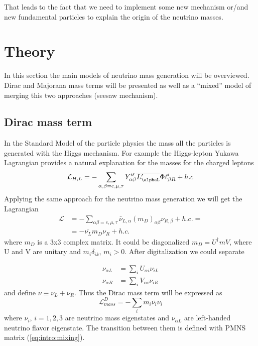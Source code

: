 \documentclass[../main.tex]{subfiles}
\begin{document}
That leads to the fact that we need to implement some new mechanism or/and new fundamental particles to explain the origin of the neutrino masses.

\section{Theory}
In this section the main models of neutrino mass generation will be overviewed. Dirac and Majorana mass terms will be presented as well as a ``mixed'' model of merging this two approaches (seesaw mechanism).

\subsection{Dirac mass term}
In the Standard Model of the particle physics the mass all the particles is generated with the Higgs mechanism. For example the Higgs-lepton Yukawa Lagrangian provides a natural explanation for the masses for the charged leptons
\begin{equation}
\mathcal{L}_{H, L}=-\sum_{\alpha, \beta=e,\mu,\tau}Y'^\ell_{\alpha\beta}\overline{L'_{\alphaL}}\Phi\ell'_{\beta R}+h.c
\end{equation}
Applying the same approach for the neutrino mass generation we will get the Lagrangian
\begin{align}
\mathcal{L}&=-\sum_{\alpha\beta=e,\mu,\tau}\bar{\nu}_{L,\alpha}(m_D)_{\alpha\beta}\nu_{R,\beta}+h.c. =\nonumber \\
&=-\overline{\nu_L}m_D\nu_R+h.c.
\end{align}
where $m_D$ is a 3x3 complex matrix. It could be diagonalized $m_D=U^\dag m V$, where U and V are unitary and $m_i\delta_{ik}$, $m_i>0$. After digitalization we could separate

\begin{align}
\nu_{\alpha L}&=\sum_iU_{\alpha i}\nu_{iL} \nonumber \\
\nu_{\alpha R}&=\sum_iV_{\alpha i}\nu_{iR}
\end{align}
and define $\nu\equiv\nu_L+\nu_R$. Thus the Dirac mass term will be expressed as
\begin{equation}
\label{eq:intro:dirac}
\mathcal{L}^{D}_{mass}=-\sum_im_i\overline{\nu_i}\nu_i
\end{equation}
where $\nu_i$, $i=1, 2, 3$ are neutrino mass eigenstates and $\nu_{\alpha L}$ are left-handed neutrino flavor eigenstate. The transition between them is defined with PMNS matrix (\autoref{eq:intro:mixing}).
\end{document}
